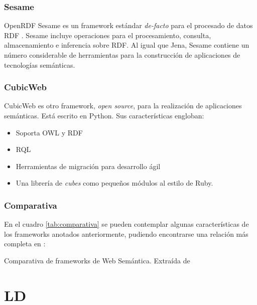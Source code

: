 \subsubsection{Sesame}

OpenRDF Sesame es un framework estándar \textit{de-facto} para el procesado de
datos RDF \cite{OPENRDF}. Sesame incluye operaciones para el procesamiento,
consulta, almacenamiento e inferencia sobre \acs{RDF}. Al igual que Jena, Sesame
contiene un número considerable de herramientas para la construcción de
aplicaciones de tecnologías semánticas. 


\subsubsection{CubicWeb}

CubicWeb \cite{CUBIC} es otro framework, \textit{open source}, para la realización de
aplicaciones semánticas. Está escrito en Python. Sus características engloban:

\begin{itemize}
\item Soporta \acs{OWL} y \acs{RDF}
\item \acf{RQL}
\item Herramientas de migración para desarrollo ágil
\item Una librería de \textit{cubes} como pequeños módulos al estilo de Ruby. 
\end{itemize}

\subsubsection{Comparativa}


En el cuadro \ref{tab:comparativa} se pueden contemplar algunas características de los
frameworks anotados anteriormente, pudiendo encontrarse una relación más
completa en \cite{W3CTools}: 


\begin{table}[hp]
  \centering
  {\small
  
  }
  \caption[Comparativa de frameworks de Web Semántica. Extraída de \cite{W3CTools}]
  {Comparativa de frameworks de Web Semántica. Extraída de \cite{W3CTools}}
  \label{tab:comparativa}
\end{table}



\section{\acf{LD}}

